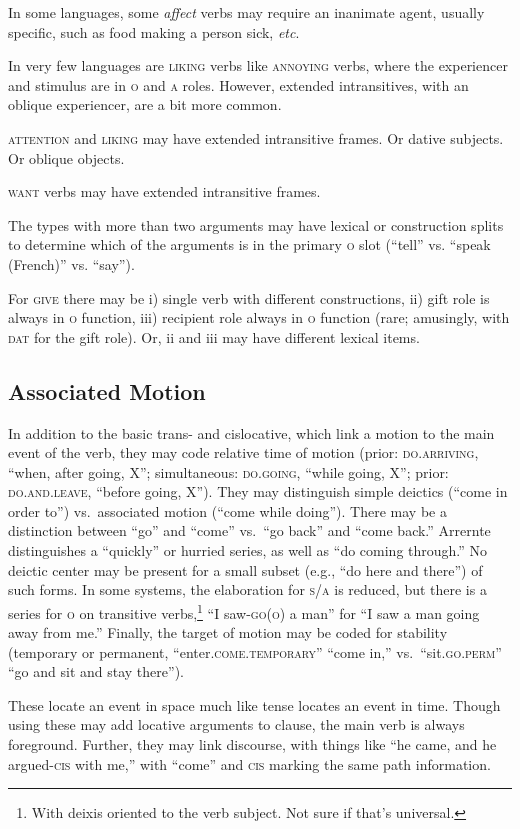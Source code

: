 \documentclass[11pt]{article}
\newcommand{\E}[1]{\textit{#1}}   %
\newcommand{\I}[1]{\textsc{#1}}   %
\begin{document}
In some languages, some \E{affect} verbs may require an inanimate
agent, usually specific, such as food making a person sick,
\textit{etc}.

In very few languages are \I{liking} verbs like \I{annoying} verbs,
where the experiencer and stimulus are in \I{o} and \I{a} roles.
However, extended intransitives, with an oblique experiencer, are a
bit more common.

\I{attention} and \I{liking} may have extended intransitive frames.
Or dative subjects.  Or oblique objects.

\I{want} verbs may have extended intransitive frames.

The types with more than two arguments may have lexical or
construction splits to determine which of the arguments is in the
primary \I{o} slot (``tell'' vs. ``speak (French)'' vs. ``say'').

For \I{give} there may be i) single verb with different constructions,
ii) gift role is always in \I{o} function, iii) recipient role always
in \I{o} function (rare; amusingly, with \I{dat} for the gift role).
Or, ii and iii may have different lexical items.


\subsection{Associated Motion}
In addition to the basic trans- and cislocative, which link a motion
to the main event of the verb, they may code relative time of motion
(prior: \I{do.arriving}, ``when, after going, X''; simultaneous:
\I{do.going}, ``while going, X''; prior: \I{do.and.leave}, ``before
going, X''). They may distinguish simple deictics (``come in order
to'') vs.\ associated motion (``come while doing'').  There may be a
distinction between ``go'' and ``come'' vs.\ ``go back'' and ``come
back.''  Arrernte distinguishes a ``quickly'' or hurried series, as
well as ``do coming through.''  No deictic center may be present for a
small subset (e.g., ``do here and there'') of such forms.  In some
systems, the elaboration for \I{s/a} is reduced, but there is a series
for \I{o} on transitive verbs,\footnote{With deixis oriented to the
verb subject.  Not sure if that's universal.} ``I saw-\I{go(o)} a
man'' for ``I saw a man going away from me.''  Finally, the target of
motion may be coded for stability (temporary or permanent,
``enter.\I{come.temporary}'' ``come in,'' vs.\ ``sit.\I{go.perm}''
``go and sit and stay there'').

These locate an event in space much like tense locates an event in
time.  Though using these may add locative arguments to clause, the
main verb is always foreground.  Further, they may link discourse,
with things like ``he came, and he argued-\I{cis} with me,'' with
``come'' and \I{cis} marking the same path information.
\end{document}
